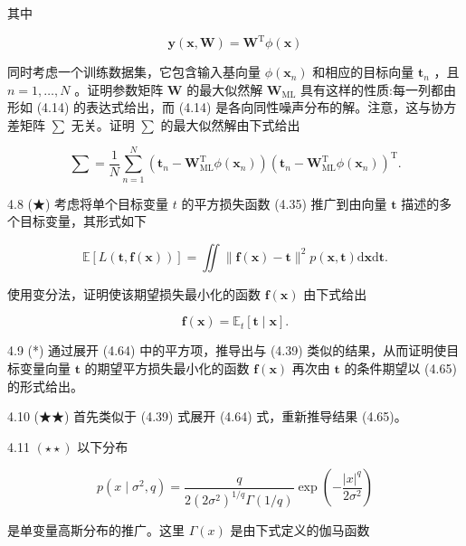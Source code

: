 \documentclass[10pt]{article}
\begin{document}
其中

\[
\mathbf{y}\left( {\mathbf{x},\mathbf{W}}\right)  = {\mathbf{W}}^{\mathrm{T}}\phi \left( \mathbf{x}\right)  \tag{4.62}
\]

同时考虑一个训练数据集，它包含输入基向量 \(\phi \left( {\mathbf{x}}_{n}\right)\) 和相应的目标向量 \({\mathbf{t}}_{n}\) ，且 \(n = 1,\ldots ,N\) 。证明参数矩阵 \(\mathbf{W}\) 的最大似然解 \({\mathbf{W}}_{\mathrm{{ML}}}\) 具有这样的性质:每一列都由形如 (4.14) 的表达式给出，而 (4.14) 是各向同性噪声分布的解。注意，这与协方差矩阵 \(\mathbf{\sum }\) 无关。证明 \(\mathbf{\sum }\) 的最大似然解由下式给出

\[
\mathbf{\sum } = \frac{1}{N}\mathop{\sum }\limits_{{n = 1}}^{N}\left( {{\mathbf{t}}_{n} - {\mathbf{W}}_{\mathrm{{ML}}}^{\mathrm{T}}\phi \left( {\mathbf{x}}_{n}\right) }\right) {\left( {\mathbf{t}}_{n} - {\mathbf{W}}_{\mathrm{{ML}}}^{\mathrm{T}}\phi \left( {\mathbf{x}}_{n}\right) \right) }^{\mathrm{T}}. \tag{4.63}
\]

4.8 (★) 考虑将单个目标变量 \(t\) 的平方损失函数 (4.35) 推广到由向量 \(\mathbf{t}\) 描述的多个目标变量，其形式如下

\[
\mathbb{E}\left\lbrack  {L\left( {\mathbf{t},\mathbf{f}\left( \mathbf{x}\right) }\right) }\right\rbrack   = \iint \parallel \mathbf{f}\left( \mathbf{x}\right)  - \mathbf{t}{\parallel }^{2}p\left( {\mathbf{x},\mathbf{t}}\right) \mathrm{d}\mathbf{x}\mathrm{d}\mathbf{t}. \tag{4.64}
\]

使用变分法，证明使该期望损失最小化的函数 \(\mathbf{f}\left( \mathbf{x}\right)\) 由下式给出

\[
\mathbf{f}\left( \mathbf{x}\right)  = {\mathbb{E}}_{t}\left\lbrack  {\mathbf{t} \mid  \mathbf{x}}\right\rbrack  . \tag{4.65}
\]

4.9 (*) 通过展开 (4.64) 中的平方项，推导出与 (4.39) 类似的结果，从而证明使目标变量向量 \(\mathbf{t}\) 的期望平方损失最小化的函数 \(\mathbf{f}\left( \mathbf{x}\right)\) 再次由 \(\mathbf{t}\) 的条件期望以 (4.65) 的形式给出。

4.10 (★★) 首先类似于 (4.39) 式展开 (4.64) 式，重新推导结果 (4.65)。

4.11 \(\left( {\star  \star  }\right)\) 以下分布

\[
p\left( {x \mid  {\sigma }^{2},q}\right)  = \frac{q}{2{\left( 2{\sigma }^{2}\right) }^{1/q}\Gamma \left( {1/q}\right) }\exp \left( {-\frac{{\left| x\right| }^{q}}{2{\sigma }^{2}}}\right)  \tag{4.66}
\]

是单变量高斯分布的推广。这里 \(\Gamma \left( x\right)\) 是由下式定义的伽马函数
\end{document}
